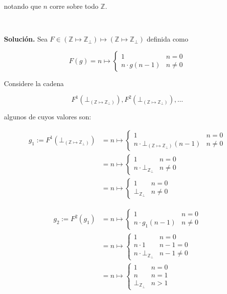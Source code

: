 \documentclass[a4paper, 12pt]{article}
\begin{document}
notando que $n$ corre sobre todo $\mathbb{Z}$.

~

\textbf{Solución.} Sea $F \in \left( \mathbb{Z} \mapsto \mathbb{Z}_\bot  \right)
\mapsto (\mathbb{Z} \mapsto \mathbb{Z}_\bot )$ definida como

\begin{equation*}
  F(g) = n \mapsto \begin{cases}
    1 & n = 0 \\ 
    n \cdot g(n - 1) & n \neq 0
  \end{cases}
\end{equation*}

Considere la cadena 

$$F^1(\bot_{\left( \mathbb{Z} \mapsto \mathbb{Z}_\bot  \right)}), F^2\left(
\bot_{\left( \mathbb{Z} \mapsto \mathbb{Z}_\bot  \right)} \right), \ldots $$

algunos de cuyos valores son: 

\begin{align*}
  g_1 := F^1\left( \bot_{\left( \mathbb{Z} \mapsto \mathbb{Z}_\bot  \right)} \right)  
  &=
  n \mapsto \begin{cases}
    1 & n = 0 \\ 
    n \cdot \bot_{\left( \mathbb{Z} \mapsto \mathbb{Z}_\bot  \right)}(n-1) & n
    \neq 0
  \end{cases} \\ 
  &= n\mapsto \begin{cases}
    1 & n = 0 \\ 
    n \cdot \bot_{\mathbb{Z}_\bot } & n \neq 0
  \end{cases} \\
  &= n\mapsto \begin{cases}
    1 & n = 0 \\ 
    \bot_{\mathbb{Z}_\bot } & n \neq 0
  \end{cases} 
\end{align*}

\begin{align*}
  g_2 := F^2\left( g_1 \right)  
  &=
  n \mapsto \begin{cases}
    1 & n = 0 \\ 
    n \cdot g_1(n - 1) & n \neq 0
  \end{cases} \\ 
  &= n\mapsto \begin{cases}
    1 & n = 0 \\ 
    n \cdot 1 & n - 1 = 0 \\ 
    n \cdot \bot_{\mathbb{Z}_\bot } & n - 1 \neq 0
  \end{cases} \\
  &= n\mapsto \begin{cases}
    1 & n = 0 \\ 
    n & n = 1 \\ 
    \bot_{\mathbb{Z}_\bot } & n > 1
  \end{cases} 
\end{align*}
\end{document}
